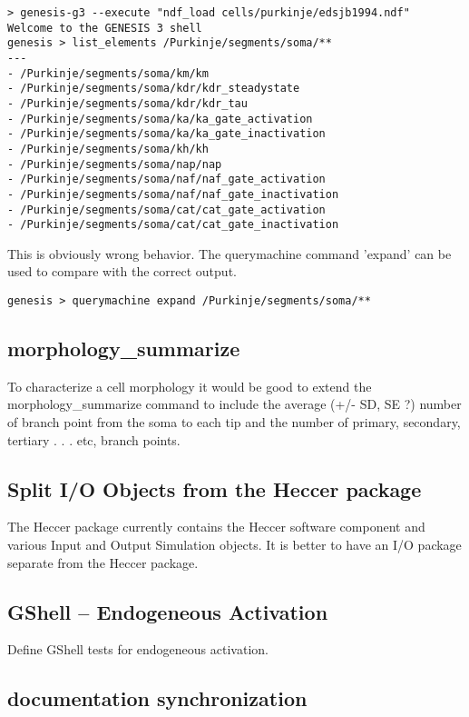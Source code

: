 \documentclass[12pt]{article}
\begin{document}
\begin{verbatim}
> genesis-g3 --execute "ndf_load cells/purkinje/edsjb1994.ndf"
Welcome to the GENESIS 3 shell
genesis > list_elements /Purkinje/segments/soma/**
---
- /Purkinje/segments/soma/km/km
- /Purkinje/segments/soma/kdr/kdr_steadystate
- /Purkinje/segments/soma/kdr/kdr_tau
- /Purkinje/segments/soma/ka/ka_gate_activation
- /Purkinje/segments/soma/ka/ka_gate_inactivation
- /Purkinje/segments/soma/kh/kh
- /Purkinje/segments/soma/nap/nap
- /Purkinje/segments/soma/naf/naf_gate_activation
- /Purkinje/segments/soma/naf/naf_gate_inactivation
- /Purkinje/segments/soma/cat/cat_gate_activation
- /Purkinje/segments/soma/cat/cat_gate_inactivation
\end{verbatim}

This is obviously wrong behavior.  The querymachine command 'expand'
can be used to compare with the correct output.

\begin{verbatim}
genesis > querymachine expand /Purkinje/segments/soma/**
\end{verbatim}


\subsection{morphology\_summarize}

To characterize a cell morphology it would be good to extend the
morphology\_summarize command to include the average (+/- SD, SE ?)
number of branch point from the soma to each tip and the number of
primary, secondary, tertiary . . . etc, branch points.


\subsection{Split I/O Objects from the Heccer package}

The Heccer package currently contains the Heccer software component
and various Input and Output Simulation objects.  It is better to have
an I/O package separate from the Heccer package.


\subsection{GShell -- Endogeneous Activation}

Define GShell tests for endogeneous activation.


\subsection{documentation synchronization}
\end{document}

